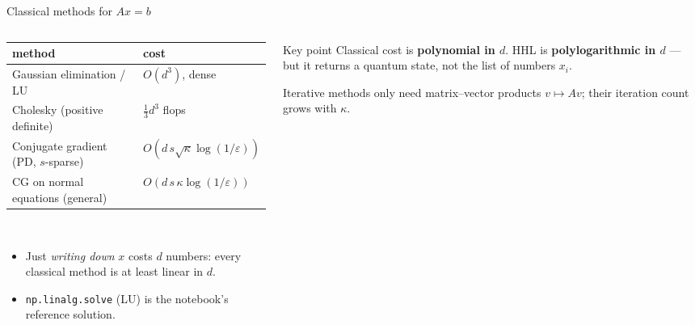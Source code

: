 \documentclass[aspectratio=169,11pt]{beamer}
\newcommand{\hl}[1]{{\color{qorange}\textbf{#1}}}
\begin{document}
\begin{frame}{Classical methods for $Ax = b$}
  \begin{columns}[T]
    \begin{column}{0.54\textwidth}
      \footnotesize
      \begin{tabular}{p{4.0cm}l}
        \toprule method & cost \\ \midrule
        Gaussian elimination / LU & $O(d^3)$, dense\\
        Cholesky (positive definite) & $\frac13d^3$ flops\\
        Conjugate gradient (PD, $s$-sparse) & $O(d\,s\sqrt\kappa\log(1/\varepsilon))$\\
        CG on normal equations (general) & $O(d\,s\,\kappa\log(1/\varepsilon))$\\ \bottomrule
      \end{tabular}\\[2mm]
      \begin{itemize}
        \item Just \emph{writing down} $x$ costs $d$ numbers: every classical method is at least linear in $d$.
        \item \texttt{np.linalg.solve} (LU) is the notebook's reference solution.
      \end{itemize}
    \end{column}
    \begin{column}{0.42\textwidth}
      \begin{block}{Key point}
        Classical cost is \hl{polynomial in $d$}. HHL is \hl{polylogarithmic in $d$} --- but it returns a quantum state, not the list of
        numbers $x_i$.
      \end{block}
      \small Iterative methods only need matrix--vector products $v\mapsto Av$; their iteration count grows with $\kappa$.
    \end{column}
  \end{columns}
\end{frame}
\end{document}
